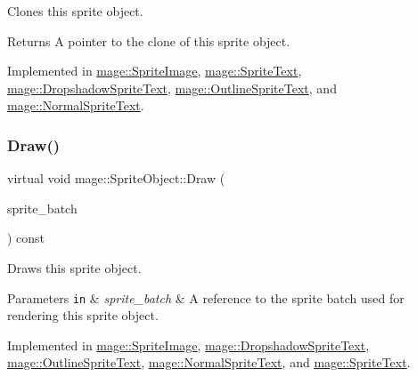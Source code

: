 Clones this sprite object.

\begin{DoxyReturn}{Returns}
A pointer to the clone of this sprite object. 
\end{DoxyReturn}


Implemented in \hyperlink{classmage_1_1_sprite_image_ab1261e3d33ef4de77523bd9c0920dd54}{mage\+::\+Sprite\+Image}, \hyperlink{classmage_1_1_sprite_text_acf74e687f38c6253bf5851bc4548352e}{mage\+::\+Sprite\+Text}, \hyperlink{classmage_1_1_dropshadow_sprite_text_a300716c6bd3a6087d3c637253cb61cc1}{mage\+::\+Dropshadow\+Sprite\+Text}, \hyperlink{classmage_1_1_outline_sprite_text_a90ed9cba10e082d6ce07dfa1b6189246}{mage\+::\+Outline\+Sprite\+Text}, and \hyperlink{classmage_1_1_normal_sprite_text_ae3e8cf71bdf82a4a9df15c00d5be8799}{mage\+::\+Normal\+Sprite\+Text}.

\hypertarget{classmage_1_1_sprite_object_a1c1c885fe7846f7ee1cc0b73571c2fa0}{}\label{classmage_1_1_sprite_object_a1c1c885fe7846f7ee1cc0b73571c2fa0} 
\subsubsection{\texorpdfstring{Draw()}{Draw()}}
{\footnotesize\ttfamily virtual void mage\+::\+Sprite\+Object\+::\+Draw (\begin{DoxyParamCaption}\item[{Sprite\+Batch \&}]{sprite\+\_\+batch }\end{DoxyParamCaption}) const\hspace{0.3cm}{\ttfamily [pure virtual]}}

Draws this sprite object.


\begin{DoxyParams}[1]{Parameters}
\mbox{\tt in}  & {\em sprite\+\_\+batch} & A reference to the sprite batch used for rendering this sprite object. \\
\hline
\end{DoxyParams}


Implemented in \hyperlink{classmage_1_1_sprite_image_ae30d3293931f674fea17008063755bb6}{mage\+::\+Sprite\+Image}, \hyperlink{classmage_1_1_dropshadow_sprite_text_af76422c9812d7dc38e9b98e587103c67}{mage\+::\+Dropshadow\+Sprite\+Text}, \hyperlink{classmage_1_1_outline_sprite_text_a524e9ad1caeeeaa32405e61d1a5e1032}{mage\+::\+Outline\+Sprite\+Text}, \hyperlink{classmage_1_1_normal_sprite_text_ad2a1b02bea18afd6bf61b106a727a355}{mage\+::\+Normal\+Sprite\+Text}, and \hyperlink{classmage_1_1_sprite_text_a45d5ac8410d5a46b26e8491946a2ad9e}{mage\+::\+Sprite\+Text}.

